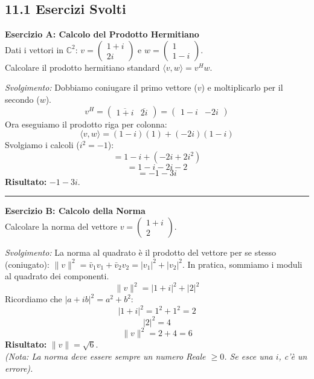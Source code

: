 \documentclass[10pt,a4paper]{article}
\begin{document}
\vspace{0.4cm}

\subsection*{11.1 Esercizi Svolti}

\textbf{Esercizio A: Calcolo del Prodotto Hermitiano}
\\ Dati i vettori in $\mathbb{C}^2$: $v = \begin{pmatrix} 1+i \\ 2i \end{pmatrix}$ e $w = \begin{pmatrix} 1 \\ 1-i \end{pmatrix}$.
\\ Calcolare il prodotto hermitiano standard $\langle v, w \rangle = v^H w$.

\textit{Svolgimento:}
Dobbiamo coniugare il primo vettore ($v$) e moltiplicarlo per il secondo ($w$).
\[ v^H = \begin{pmatrix} \overline{1+i} & \overline{2i} \end{pmatrix} = \begin{pmatrix} 1-i & -2i \end{pmatrix} \]
Ora eseguiamo il prodotto riga per colonna:
\[ \langle v, w \rangle = (1-i)(1) + (-2i)(1-i) \]
Svolgiamo i calcoli ($i^2 = -1$):
\[ = 1 - i + (-2i + 2i^2) \]
\[ = 1 - i - 2i - 2 \]
\[ = -1 - 3i \]
\textbf{Risultato:} $-1 - 3i$.

\vspace{0.4cm}
\hrule
\vspace{0.4cm}

\textbf{Esercizio B: Calcolo della Norma}
\\ Calcolare la norma del vettore $v = \begin{pmatrix} 1+i \\ 2 \end{pmatrix}$.

\textit{Svolgimento:}
La norma al quadrato è il prodotto del vettore per se stesso (coniugato): $\|v\|^2 = \bar{v}_1 v_1 + \bar{v}_2 v_2 = |v_1|^2 + |v_2|^2$.
In pratica, sommiamo i moduli al quadrato dei componenti.
\[ \|v\|^2 = |1+i|^2 + |2|^2 \]
Ricordiamo che $|a+ib|^2 = a^2 + b^2$:
\[ |1+i|^2 = 1^2 + 1^2 = 2 \]
\[ |2|^2 = 4 \]
\[ \|v\|^2 = 2 + 4 = 6 \]
\textbf{Risultato:} $\|v\| = \sqrt{6}$.
\\ \textit{(Nota: La norma deve essere sempre un numero Reale $\ge 0$. Se esce una $i$, c'è un errore).}
\end{document}
